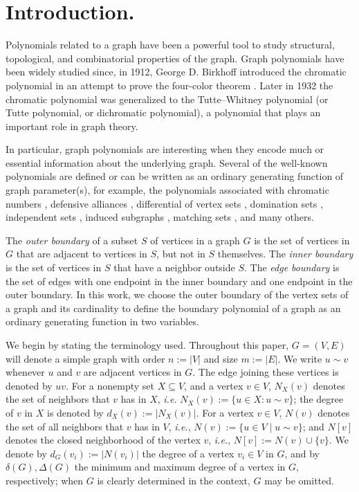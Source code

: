 \documentclass[review]{elsarticle}
\renewcommand{\d}{\delta}
\newcommand{\D}{\Delta}
\begin{document}

\section{Introduction.}
Polynomials related to a graph have been a powerful tool to study structural, topological, and combinatorial properties of the graph. 
Graph polynomials have been widely studied since, in 1912, George D. Birkhoff introduced the chromatic polynomial in an attempt to prove the four-color theorem \cite{Bi}. 
Later in 1932 the chromatic polynomial was generalized to the Tutte--Whitney polynomial (or Tutte polynomial, or dichromatic polynomial), a polynomial that plays an important role in graph theory.

 In particular, graph polynomials are interesting when they encode much or essential information about the underlying graph. Several of the well-known polynomials are defined or can be written as an ordinary generating function of graph parameter(s), for example, the polynomials associated with chromatic numbers \cite{R,T}, defensive alliances \cite{CHRT,CRST}, differential of vertex sets \cite{BCLS}, domination sets \cite{AB}, independent sets \cite{BDN,GH}, induced subgraphs \cite{TAM}, matching sets \cite{F,GG}, and many others.   
 
 
 The \emph{outer boundary} of a subset $S$ of vertices in a graph $G$ is the set of vertices in $G$ that are adjacent to vertices in $S$, but not in $S$ themselves. The \emph{inner boundary} is the set of vertices in $S$ that have a neighbor outside $S$. The \emph{edge boundary} is the set of edges with one endpoint in the inner boundary and one endpoint in the outer boundary. In this work, we choose the outer boundary of the vertex sets of a graph and its cardinality to define the boundary polynomial of a graph as an ordinary generating function in two variables. 


We begin by stating the terminology used.
Throughout this paper, $G=(V,E)$ will denote a simple graph with order $n:=|V|$ and size $m:=|E|$. 
We write $u\sim v$ whenever $u$ and $v$ are adjacent vertices in $G$.
The edge joining these vertices is denoted by $uv$.
For a nonempty set $X\subseteq V$, and a vertex $v\in V$, $N_X(v)$ denotes
the set of neighbors that $v$ has in $X$, \emph{i.e.} $N_X(v):=\{u\in X: u\sim v\}$;
the degree of $v$ in $ X$  is denoted by $d_{X}(v):=|N_{X}(v)|$.
For a vertex $v\in V$, $N(v)$ denotes the set of all neighbors that $v$ has
in $V$, \emph{i.e.}, $N(v):=\{u\in V \; | \; u\sim v\}$; and $N[v]$ denotes
the closed neighborhood of the vertex $v$, \emph{i.e.}, $N[v]:= N(v)\cup \{v\}$.
We denote by $d_G(v_i):=|N(v_i)|$ the degree of a
vertex $v_i\in V$ in $G$, and by $\d(G), \D(G)$ the minimum and maximum degree of a vertex in $G$, respectively; when $G$ is clearly determined in the context, $G$ may be omitted. 
\end{document}
